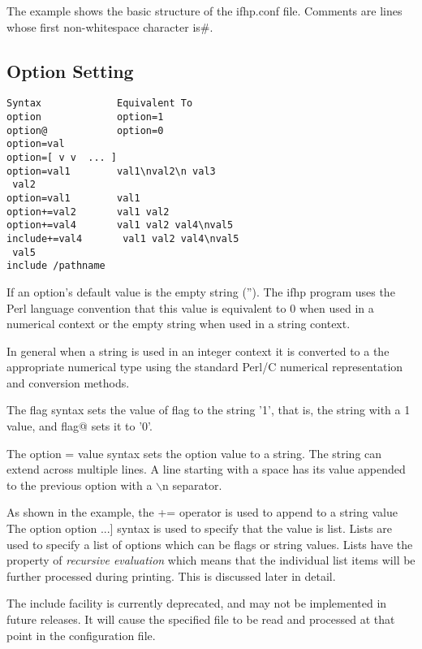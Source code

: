 \documentclass[a4paper]{article}
\begin{document}
The example shows the basic structure of the {\ttfamily ifhp.conf} file.
Comments are lines whose first non-whitespace character is{\ttfamily \#}.


\subsection{Option Setting}

\begin{tscreen}
\begin{verbatim}
Syntax             Equivalent To
option             option=1
option@            option=0
option=val
option=[ v v  ... ]
option=val1        val1\nval2\n val3
 val2 
option=val1        val1
option+=val2       val1 val2
option+=val4       val1 val2 val4\nval5
include+=val4       val1 val2 val4\nval5
 val5
include /pathname
\end{verbatim}
\end{tscreen}


If an option's default value is the empty string ({\ttfamily ''}).
The {\ttfamily ifhp} program uses the Perl language convention that this
value is equivalent to 0 when used in a numerical context or
the empty string when used in a string context.

In general when a string is used in an integer context it is converted
to a the appropriate numerical type using the standard Perl/C
numerical representation and conversion methods.

The {\ttfamily flag} syntax sets the value of {\ttfamily flag} to the string {\ttfamily '1'},
that is, the string with a 1 value, and {\ttfamily flag@} sets it to {\ttfamily '0'}. 

The {\ttfamily option = value} syntax sets the option value to a string.
The string can extend across multiple lines.
A line starting with a space has its value appended to the
previous option with a {\ttfamily $\backslash$n} separator.

As shown in the example,
the {\ttfamily +=} operator is used to append to a string value
The {\ttfamily {[} option option ...{]}} syntax is used to specify that the
value is list.
Lists are used to specify a list of options which can be flags or string
values.
Lists have the property of
{\itshape recursive evaluation\/}
which means that the individual list items will be further processed during
printing.
This is discussed later in detail.

The {\ttfamily include} facility is currently deprecated,
and may not be implemented in future releases.
It will cause the specified file to be read and processed at
that point in the configuration file.
\end{document}
